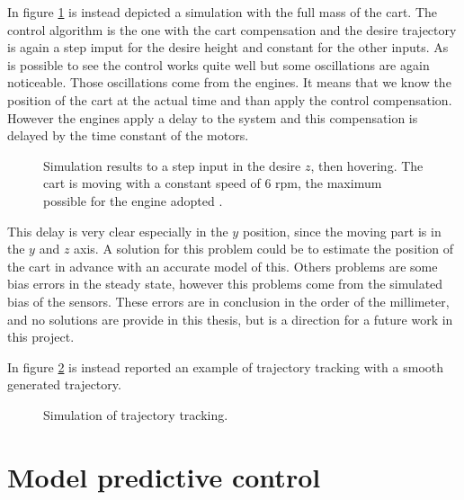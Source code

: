 \noindent In figure \ref{fig:simulation2} is instead depicted a simulation with the full mass of the cart. The control algorithm is the one with the cart compensation and the desire trajectory is again a step imput for the desire height and constant for the other inputs. As is possible to see the control works quite well but some oscillations are again noticeable. Those oscillations come from the engines. It means that we know the position of the cart at the actual time and than apply the control compensation. However the engines apply a delay to the system and this compensation is delayed by the time constant of the motors. 

\begin{figure}[h]
	\centering
 	
 	\caption{Simulation results to a step input in the desire $z$, then hovering. The cart is moving with a constant speed of $6$ rpm, the maximum possible for the engine adopted \cite{Carlos}.}
 	\label{fig:simulation2}		
\end{figure}

\noindent This delay is very clear especially in the $y$ position, since the moving part is in the $y$ and $z$ axis. A solution for this problem could be to estimate the position of the cart in advance with an accurate model of this. Others problems are some bias errors in the steady state, however this problems come from the simulated bias of the sensors. These errors are in conclusion in the order of the millimeter, and no solutions are provide in this thesis, but is a direction for a future work in this project.

\noindent In figure \ref{fig:trajectoryTrackingLee} is instead reported an example of trajectory tracking with a smooth generated trajectory.

\begin{figure}[h!]
	\centering
	
	\caption{Simulation of trajectory tracking.}
	\label{fig:trajectoryTrackingLee}		
\end{figure}


\section{Model predictive control}

